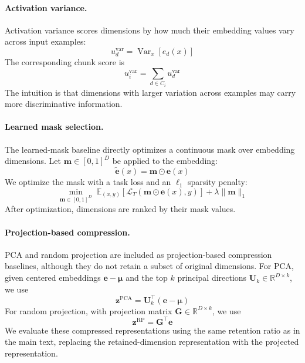 \documentclass[11pt]{article}
\begin{document}
\paragraph{Activation variance.}
Activation variance scores dimensions by how much their embedding values vary across input examples:
\begin{equation}
u_d^{\mathrm{var}}
=
\operatorname{Var}_{x}\left[e_d(x)\right]
\end{equation}
The corresponding chunk score is
\begin{equation}
u_i^{\mathrm{var}}
=
\sum_{d\in C_i}u_d^{\mathrm{var}} 
\end{equation}
The intuition is that dimensions with larger variation across examples may carry more discriminative information.

\paragraph{Learned mask selection.}
The learned-mask baseline directly optimizes a continuous mask over embedding dimensions. Let $\mathbf{m}\in[0,1]^D$ be applied to the embedding:
\begin{equation}
\tilde{\mathbf{e}}(x)
=
\mathbf{m}\odot\mathbf{e}(x)
\end{equation}
We optimize the mask with a task loss and an $\ell_1$ sparsity penalty:
\begin{equation}
\min_{\mathbf{m}\in[0,1]^D}
\;
\mathbb{E}_{(x,y)}
\left[
\mathcal{L}_T(\mathbf{m}\odot\mathbf{e}(x),y)
\right]
+
\lambda\|\mathbf{m}\|_1 
\end{equation}
After optimization, dimensions are ranked by their mask values.

\paragraph{Projection-based compression.}
PCA and random projection are included as projection-based compression baselines, although they do not retain a subset of original dimensions. For PCA, given centered embeddings $\mathbf{e}-\boldsymbol{\mu}$ and the top $k$ principal directions $\mathbf{U}_k\in\mathbb{R}^{D\times k}$, we use
\begin{equation}
\mathbf{z}^{\mathrm{PCA}}
=
\mathbf{U}_k^\top(\mathbf{e}-\boldsymbol{\mu})
\end{equation}
For random projection, with projection matrix $\mathbf{G}\in\mathbb{R}^{D\times k}$, we use
\begin{equation}
\mathbf{z}^{\mathrm{RP}}
=
\mathbf{G}^\top\mathbf{e}
\end{equation}
We evaluate these compressed representations using the same retention ratio as in the main text, replacing the retained-dimension representation with the projected representation.
\end{document}
